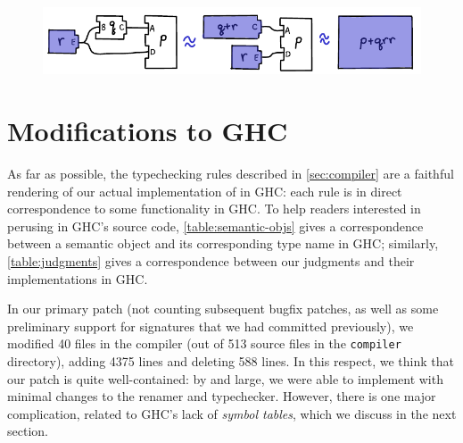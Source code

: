 \begin{figure}[H]
\center\includegraphics{figures/unit-identifier-improvement.pdf}
\end{figure}

\section{Modifications to GHC}

As far as possible, the typechecking rules described in
\cref{sec:compiler} are a faithful rendering of our
actual implementation of \Backpack{} in GHC\@: each rule
is in direct correspondence to some functionality in
GHC\@.  To help readers interested in perusing \Backpack{} in GHC's
source code, \cref{table:semantic-objs} gives a correspondence
between a semantic object and its corresponding type name in GHC\@;
similarly, \cref{table:judgments} gives a correspondence between
our judgments and their implementations in GHC\@.

In our primary \Backpack{} patch (not counting subsequent bugfix
patches, as well as some preliminary support for signatures that we had
committed previously), we modified 40 files in the compiler (out of 513
source files in the \verb|compiler| directory), adding 4375 lines and
deleting 588 lines.  In this respect, we think that our \Backpack{}
patch is quite well-contained: by and large, we were able to implement
\Backpack{} with minimal changes to the renamer and typechecker.
However, there is one major complication, related to GHC's lack
of \emph{symbol tables}, which we discuss in the next section.

